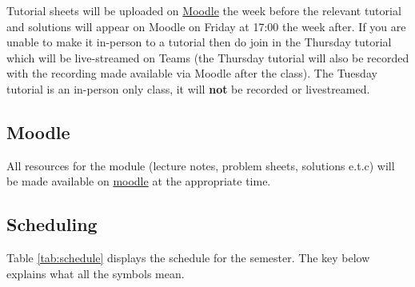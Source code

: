 \documentclass[
  a4paper,
  oneside,
  final]{krantz}
\theoremstyle{definition}
\theoremstyle{definition}
\theoremstyle{definition}
\theoremstyle{definition}
\theoremstyle{remark}
\begin{document}
Tutorial sheets will be uploaded on \href{https://moody.st-andrews.ac.uk/moodle/my/}{Moodle} the week before the relevant tutorial and solutions will appear on Moodle on Friday at 17:00 the week after. If you are unable to make it in-person to a tutorial then do join in the Thursday tutorial which will be live-streamed on Teams (the Thursday tutorial will also be recorded with the recording made available via Moodle after the class). The Tuesday tutorial is an in-person only class, it will \textbf{not} be recorded or livestreamed.

\hypertarget{moodle}{%
\subsection*{Moodle}\label{moodle}}


All resources for the module (lecture notes, problem sheets, solutions e.t.c) will be made available on \href{https://moody.st-andrews.ac.uk/moodle/my/}{moodle} at the appropriate time.

\hypertarget{scheduling}{%
\subsection*{Scheduling}\label{scheduling}}


Table \ref{tab:schedule} displays the schedule for the semester. The key below explains what all the symbols mean.

 
  \providecommand{\huxb}[2]{\arrayrulecolor[RGB]{#1}\global\arrayrulewidth=#2pt}
  \providecommand{\huxvb}[2]{\color[RGB]{#1}\vrule width #2pt}
  \providecommand{\huxtpad}[1]{\rule{0pt}{#1}}
  \providecommand{\huxbpad}[1]{\rule[-#1]{0pt}{#1}}
\end{document}
